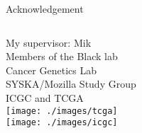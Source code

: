 \documentclass[handout]{beamer}
\begin{document}


\begin{frame}{Acknowledgement}
	\begin{columns}
		My supervisor: Mik\\
		Members of the Black lab\\
		Cancer Genetics Lab\\
		SYSKA/Mozilla Study Group\\
		ICGC and TCGA\\
		\texttt{[image: ./images/tcga]}\\
		\texttt{[image: ./images/icgc]}
	\end{columns}
\end{frame}

% 	
% 	

\end{document}
